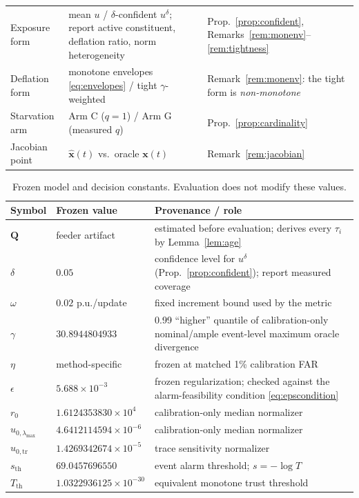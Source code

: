 \documentclass[journal]{IEEEtran}
\theoremstyle{plain}
\theoremstyle{definition}
\theoremstyle{remark}
\newcommand{\bx}{\mathbf{x}}
\newcommand{\bxh}{\hat{\mathbf{x}}}
\newcommand{\lmax}{\lambda_{\max}}
\newcommand{\bQ}{\mathbf{Q}}
\begin{document}
\begin{table}[!t]
\begin{tabular}{@{}l p{2.5cm} p{2.4cm}@{}}
Exposure form & mean $u$ / $\delta$-confident $u^{\delta}$; report active
constituent, deflation ratio, norm heterogeneity &
Prop.~\ref{prop:confident}, Remarks~\ref{rem:monenv}--\ref{rem:tightness} \\
Deflation form & monotone envelopes \eqref{eq:envelopes} / tight
$\gamma$-weighted & Remark~\ref{rem:monenv}: the tight form is
\emph{non-monotone} \\
Starvation arm & Arm C ($q{=}1$) / Arm G (measured $q$) &
Prop.~\ref{prop:cardinality} \\
Jacobian point & $\bxh(t)$ vs.\ oracle $\bx(t)$ & Remark~\ref{rem:jacobian} \\
\bottomrule
\end{tabular}
\end{table}

\begin{table}[!t]
\caption{Frozen model and decision constants. Evaluation does not modify
these values.}
\label{tab:hyper}
\centering
\footnotesize
\renewcommand{\arraystretch}{1.2}
\begin{tabular}{@{}l p{2.3cm} p{2.9cm}@{}}
\toprule
Symbol & Frozen value & Provenance / role \\
\midrule
$\bQ$ & feeder artifact & estimated before evaluation; derives every
$\tau_i$ by Lemma~\ref{lem:age} \\
$\delta$ & $0.05$ & confidence level for $u^{\delta}$
(Prop.~\ref{prop:confident}); report measured coverage \\
$\omega$ & $0.02$ p.u./update & fixed increment bound used by the metric \\
$\gamma$ & $30.8944804933$ & 0.99 ``higher'' quantile of calibration-only
nominal/ample event-level maximum oracle divergence \\
$\eta$ & method-specific & frozen at matched 1\% calibration FAR \\
$\epsilon$ & $5.688\times10^{-3}$ & frozen regularization; checked against
the alarm-feasibility condition \eqref{eq:epscondition} \\
$r_0$ & $1.6124353830\times10^{4}$ & calibration-only median normalizer \\
$u_{0,\lmax}$ & $4.6412114594\times10^{-6}$ & calibration-only median normalizer \\
$u_{0,\mathrm{tr}}$ & $1.4269342674\times10^{-5}$ & trace sensitivity normalizer \\
$s_{\mathrm{th}}$ & $69.0457696550$ & event alarm threshold; $s=-\log T$ \\
$T_{\mathrm{th}}$ & $1.0322936125\times10^{-30}$ & equivalent monotone trust threshold \\

\end{tabular}
\end{table}
\end{document}
